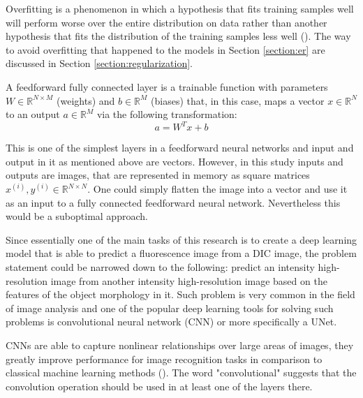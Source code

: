 \begin{definition}[Overfitting]
	Overfitting is a phenomenon in which a hypothesis that fits training samples well will perform worse over the entire distribution on data rather than another hypothesis that fits the distribution of the training samples less well (\cite{mitchell_1997}). The way to avoid overfitting that happened to the models in Section \ref{section:er} are discussed in Section \ref{section:regularization}.
\end{definition}

\begin{definition}
	A feedforward fully connected layer is a trainable function with parameters $W \in \mathbb{R}^{N \times M}$ (weights) and $b \in \mathbb{R}^{M}$ (biases) that, in this case, maps a vector $x \in \mathbb{R}^{N}$ to an output $a \in \mathbb{R}^{M}$ via the following transformation:
		\begin{equation}
			a = W^{T}x + b
		\end{equation}
\end{definition}

This is one of the simplest layers in a feedforward neural networks and input and output in it as mentioned above are vectors. However, in this study inputs and outputs are images, that are represented in memory as square matrices $x^{(i)}, y^{(i)} \in \mathbb{R}^{N \times N}$. One could simply flatten the image into a vector and use it as an input to a fully connected feedforward neural network. Nevertheless this would be a suboptimal approach. 

Since essentially one of the main tasks of this research is to create a deep learning model that is able to predict a fluorescence image from a DIC image, the problem statement could be narrowed down to the following: predict an intensity high-resolution image from another intensity high-resolution image based on the features of the object morphology in it. Such problem is very common in the field of image analysis and one of the popular deep learning tools for solving such problems is convolutional neural network (CNN) or more specifically a UNet.

CNNs are able to capture nonlinear relationships over large areas of images, they greatly improve performance for image recognition tasks in comparison to classical machine learning methods (\cite{Ounkomol_2018}). The word "convolutional" suggests that the convolution operation should be used in at least one of the layers there.  


